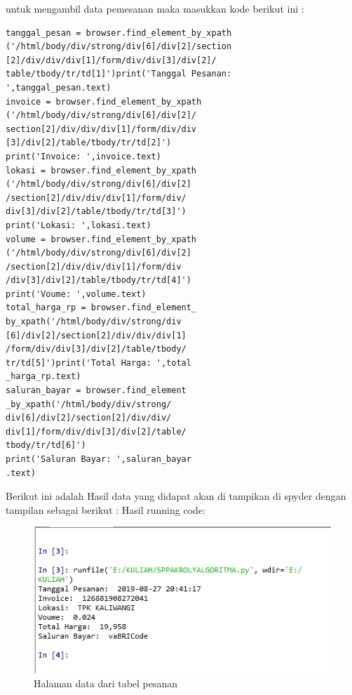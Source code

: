 untuk mengambil data pemesanan  maka masukkan kode berikut ini :
\begin{verbatim}
tanggal_pesan = browser.find_element_by_xpath
('/html/body/div/strong/div[6]/div[2]/section
[2]/div/div/div[1]/form/div/div[3]/div[2]/
table/tbody/tr/td[1]')print('Tanggal Pesanan:
',tanggal_pesan.text)
invoice = browser.find_element_by_xpath
('/html/body/div/strong/div[6]/div[2]/
section[2]/div/div/div[1]/form/div/div
[3]/div[2]/table/tbody/tr/td[2]')
print('Invoice: ',invoice.text)
lokasi = browser.find_element_by_xpath
('/html/body/div/strong/div[6]/div[2]
/section[2]/div/div/div[1]/form/div/
div[3]/div[2]/table/tbody/tr/td[3]')
print('Lokasi: ',lokasi.text)
volume = browser.find_element_by_xpath
('/html/body/div/strong/div[6]/div[2]
/section[2]/div/div/div[1]/form/div
/div[3]/div[2]/table/tbody/tr/td[4]')
print('Voume: ',volume.text)
total_harga_rp = browser.find_element_
by_xpath('/html/body/div/strong/div
[6]/div[2]/section[2]/div/div/div[1]
/form/div/div[3]/div[2]/table/tbody/
tr/td[5]')print('Total Harga: ',total
_harga_rp.text)
saluran_bayar = browser.find_element
_by_xpath('/html/body/div/strong/
div[6]/div[2]/section[2]/div/div/
div[1]/form/div/div[3]/div[2]/table/
tbody/tr/td[6]')
print('Saluran Bayar: ',saluran_bayar
.text)
\end{verbatim}

Berikut ini adalah Hasil data yang didapat 
akan di tampikan di spyder dengan tampilan sebagai berikut :
Hasil running code:
\begin{figure}[h]
	\centering
	\includegraphics[scale=0.6]{figures/784}
	\caption{Halaman data dari tabel pesanan}
\end{figure}

